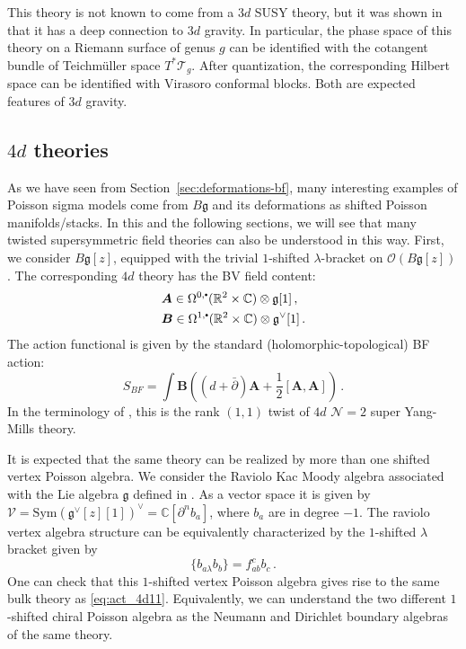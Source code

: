 \documentclass[11pt]{article}
\newcommand{\C}{\mathbb{C}}
\newcommand{\R}{\mathbb{R}}
\newcommand\sbullet[1][.5]{\mathbin{\vcenter{\hbox{\scalebox{#1}{$\bullet$}}}}}
\numberwithin{equation}{section}
\begin{document}
This theory is not known to come from a $3d$ SUSY theory, but it was shown in \cite{khan2025poisson} that it has a deep connection to $3d$ gravity. In particular, the phase space of this theory on a Riemann surface of genus $g$ can be identified with the cotangent bundle of Teichm\"uller space $T^*\mathcal{T}_g$. After quantization, the corresponding Hilbert space can be identified with Virasoro conformal blocks. Both are expected features of $3d$ gravity.


\subsection{$4d$ theories}

As we have seen from Section~\ref{sec:deformations-bf}, many interesting examples of Poisson sigma models come from $B\mathfrak{g}$ and its deformations as shifted Poisson manifolds/stacks. In this and the following sections, we will see that many twisted supersymmetric field theories can also be understood in this way. First, we consider $B\mathfrak{g}[z]$, equipped with the trivial $1$-shifted $\lambda$-bracket on $\mathcal{O}(B\mathfrak{g}[z])$. The corresponding $4d$ theory has the BV field content:
\begin{equation}
	\begin{aligned}
		&\boldsymbol{A} \in \Omega^{0,\sbullet}(\R^2\times\C)\otimes \mathfrak{g}[1]\,,\\
		&\boldsymbol{B} \in \Omega^{1,\sbullet}(\R^2\times\C)\otimes \mathfrak{g}^{\vee}[1]\,.
	\end{aligned}
\end{equation}
The action functional is given by the standard (holomorphic-topological) BF action:
\begin{equation}\label{eq:act_4d11}
	S_{BF} = \int \boldsymbol{B}\left( (d+\bar{\partial})\boldsymbol{A} + \frac{1}{2}[\boldsymbol{A},\boldsymbol{A}]\right)\,.
\end{equation}
In the terminology of \cite{Elliott:2020ecf}, this is the rank $(1,1)$ twist of $4d$ $\mathcal{N} = 2$ super Yang-Mills theory.

It is expected that the same theory can be realized by more than one shifted vertex Poisson algebra. We consider the Raviolo Kac Moody algebra associated with the Lie algebra $\mathfrak{g}$ defined in \cite{garner2025raviolo}. As a vector space it is given by $\mathcal{V} = \mathrm{Sym}(\mathfrak{g}^{\vee}[z][1])^{\vee} = \C[\partial^nb_a]$, where $b_a$ are in degree $-1$. The raviolo vertex algebra structure can be equivalently characterized by the $1$-shifted $\lambda$ bracket given by
 \begin{equation}
\{b_{a\lambda}b_b\} = f_{ab}^cb_c\,.
 \end{equation}
One can check that this $1$-shifted vertex Poisson algebra gives rise to the same bulk theory as \eqref{eq:act_4d11}. Equivalently, we can understand the two different $1$-shifted chiral Poisson algebra as the Neumann and Dirichlet boundary algebras of the same theory.
\end{document}
